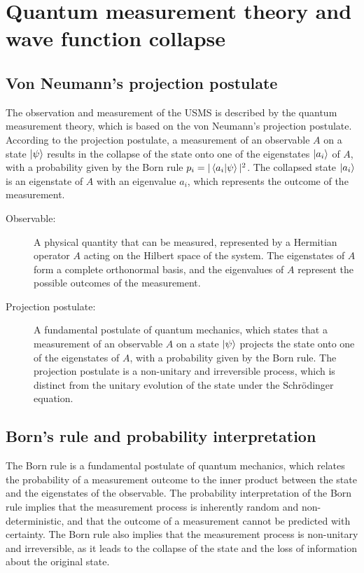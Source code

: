 \section{Quantum measurement theory and wave function collapse}
\subsection{Von Neumann's projection postulate}
The observation and measurement of the USMS is described by the quantum measurement theory, which is based on the von Neumann's projection postulate. According to the projection postulate, a measurement of an observable $A$ on a state $\ket{\psi}$ results in the collapse of the state onto one of the eigenstates $\ket{a_i}$ of $A$, with a probability given by the Born rule $p_i = |\braket{a_i|\psi}|^2$. The collapsed state $\ket{a_i}$ is an eigenstate of $A$ with an eigenvalue $a_i$, which represents the outcome of the measurement.

\begin{tcolorbox}[colback=blue!5!white,colframe=blue!75!black,title=New terms]
\begin{description}
\item[Observable:] A physical quantity that can be measured, represented by a Hermitian operator $A$ acting on the Hilbert space of the system. The eigenstates of $A$ form a complete orthonormal basis, and the eigenvalues of $A$ represent the possible outcomes of the measurement.
\item[Projection postulate:] A fundamental postulate of quantum mechanics, which states that a measurement of an observable $A$ on a state $\ket{\psi}$ projects the state onto one of the eigenstates of $A$, with a probability given by the Born rule. The projection postulate is a non-unitary and irreversible process, which is distinct from the unitary evolution of the state under the Schrödinger equation.
\end{description}
\end{tcolorbox}

\subsection{Born's rule and probability interpretation}
The Born rule is a fundamental postulate of quantum mechanics, which relates the probability of a measurement outcome to the inner product between the state and the eigenstates of the observable. The probability interpretation of the Born rule implies that the measurement process is inherently random and non-deterministic, and that the outcome of a measurement cannot be predicted with certainty. The Born rule also implies that the measurement process is non-unitary and irreversible, as it leads to the collapse of the state and the loss of information about the original state.

